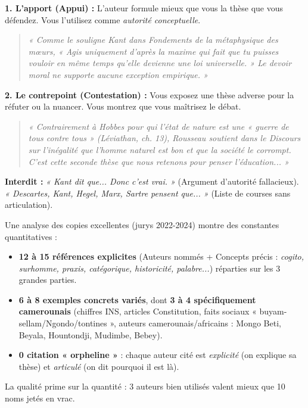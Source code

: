 \documentclass[11pt]{article}
\begin{document}
\begin{propriete}
\textbf{1. L'apport (Appui) :} L'auteur formule mieux que vous la thèse que vous défendez. Vous l'utilisez comme \emph{autorité conceptuelle}.
\begin{quote}
\emph{« Comme le souligne Kant dans \textit{Fondements de la métaphysique des mœurs}, « Agis uniquement d'après la maxime qui fait que tu puisses vouloir en même temps qu'elle devienne une loi universelle. » Le devoir moral ne supporte aucune exception empirique. »}
\end{quote}

\textbf{2. Le contrepoint (Contestation) :} Vous exposez une thèse adverse pour la réfuter ou la nuancer. Vous montrez que vous maîtrisez le débat.
\begin{quote}
\emph{« Contrairement à Hobbes pour qui l'état de nature est une « guerre de tous contre tous » (\textit{Léviathan}, ch. 13), Rousseau soutient dans le \textit{Discours sur l'inégalité} que l'homme naturel est bon et que la société le corrompt. C'est cette seconde thèse que nous retenons pour penser l'éducation... »}
\end{quote}

\textbf{Interdit :} \emph{« Kant dit que... Donc c'est vrai. »} (Argument d'autorité fallacieux). \emph{« Descartes, Kant, Hegel, Marx, Sartre pensent que... »} (Liste de courses sans articulation).
\end{propriete}

\begin{exemplebox}
Une analyse des copies excellentes (jurys 2022-2024) montre des constantes quantitatives :
\begin{itemize}
    \item \textbf{12 à 15 références explicites} (Auteurs nommés + Concepts précis : \emph{cogito, surhomme, praxis, catégorique, historicité, palabre...}) réparties sur les 3 grandes parties.
    \item \textbf{6 à 8 exemples concrets variés}, dont \textbf{3 à 4 spécifiquement camerounais} (chiffres INS, articles Constitution, faits sociaux « buyam-sellam/Ngondo/tontines », auteurs camerounais/africains : Mongo Beti, Beyala, Hountondji, Mudimbe, Bebey).
    \item \textbf{0 citation « orpheline »} : chaque auteur cité est \emph{explicité} (on explique sa thèse) et \emph{articulé} (on dit pourquoi il est là).
\end{itemize}
La qualité prime sur la quantité : 3 auteurs bien utilisés valent mieux que 10 noms jetés en vrac.
\end{exemplebox}
\end{document}
